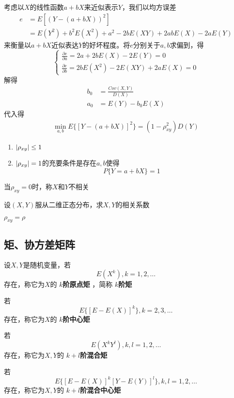 \documentclass[11pt]{article}
\begin{document}
考虑以\(X\)的线性函数\(a+bX\)来近似表示\(Y\)，我们以均方误差
\begin{align*}
e&=E[(Y-(a+bX))^2]\\
&=E(Y^2)+b^2E(X^2)+a^2-2bE(XY)+2abE(X)-2aE(Y)
\end{align*}
来衡量以\(a+bX\)近似表达\(Y\)的好坏程度。将\(e\)分别关于\(a,b\)求偏到，得
\begin{equation*}
\begin{cases}
\frac{\partial e}{\partial a}=2a+2bE(X)-2E(Y)=0\\
\frac{\partial e}{\partial b}=2bE(X^2)-2E(XY)+2aE(X)=0
\end{cases}
\end{equation*}
解得
\begin{align*}
b_0&=\frac{Cov(X,Y)}{D(X)}\\
a_0&=E(Y)-b_0E(X)
\end{align*}
代入得
\begin{align*}
\min_{a,b}E\{[Y-(a+bX)]^2\}=(1-\rho^2_{xy})D(Y)
\end{align*}
\begin{theorem}[]
\begin{enumerate}
\item \(\abs{\rho_{xy}}\le1\)
\item \(\abs{\rho_{xy}}=1\)的充要条件是存在\(a,b\)使得
\begin{equation*}
P\{Y=a+bX\}=1
\end{equation*}
\end{enumerate}
\end{theorem}

当\(\rho_{xy}=0\)时，称\(X\)和\(Y\)不相关

\begin{examplle}[]
设\((X,Y)\)服从二维正态分布，求\(X,Y\)的相关系数

\(\rho_{xy}=\rho\)
\end{examplle}
\subsection{矩、协方差矩阵}
\label{sec:org50d114d}
\begin{definition}[]
设\(X,Y\)是随机变量，若
\begin{equation*}
E(X^k),k=1,2,\dots
\end{equation*}
存在，称它为\(X\)的 \textbf{\(k\)阶原点矩} ，简称 \textbf{\(k\)阶矩}

若
\begin{equation*}
E\{[E-E(X)]^k\},k=2,3,\dots
\end{equation*}
存在，称它为\(X\)的 \textbf{\(k\)阶中心矩}

若
\begin{equation*}
E(X^kY^l),k,l=1,2,\dots
\end{equation*}
存在，称它为\(X,Y\)的 \textbf{\(k+l\)阶混合矩}

若
\begin{equation*}
E\{[E-E(X)]^k[Y-E(Y)]^l\},k,l=1,2,\dots
\end{equation*}
存在，称它为\(X,Y\)的 \textbf{\(k+l\)阶混合中心矩}
\end{definition}
\end{document}
